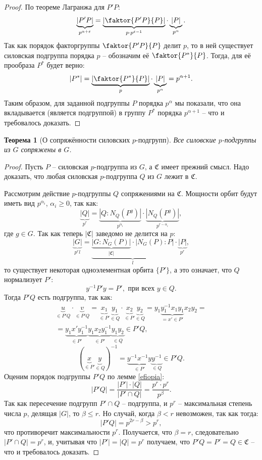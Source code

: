 \documentclass{article}
\newtheorem{theorem}{Теорема}[section]
\begin{document}
\begin{proof}
    По теореме Лагранжа для $P'P$: $$ \underbrace{|P'P|}_{p^{\alpha + \varepsilon}} = \underbrace{|\faktor{P'P}{P}|}_{p \cdot p^{\varepsilon - 1}} \cdot \underbrace{|P|}_{p^\alpha}. $$ Так как порядок факторгруппы $\faktor{P'P}{P}$ делит $p$, то в ней существует силовская подгруппа порядка $p$ -- обозначим её $\faktor{P^*}{P}$. Тогда, для её прообраза $P^*$ будет верно: $$ |P^*| = \underbrace{|\faktor{P^*}{P}|}_{p} \cdot \underbrace{|P|}_{p^\alpha} = p^{\alpha + 1}. $$ Таким образом, для заданной подгруппы $P$ порядка $p^\alpha$ мы показали, что она вкладывается (является подгруппой) в группу $P^*$ порядка $p^{\alpha + 1}$ -- что и требовалось доказать.
\end{proof}

\begin{theorem}[О сопряжённости силовских $p$-подгрупп]
    Все силовские $p$-подгруппы из $G$ сопряжены в $G$.
\end{theorem}
\begin{proof}
    Пусть $P$ -- силовская $p$-подгруппа из $G$, а $\mathfrak{C}$ имеет прежний смысл. Надо доказать, что любая силовская $p$-подгруппа $Q$ из $G$ лежит в $\mathfrak{C}$.

    Рассмотрим действие $p$-подгруппы $Q$ сопряжениями на $\mathfrak{C}$. Мощности орбит будут иметь вид $p^{\alpha_i}$, $\alpha_i \geqslant 0$, так как: $$ \underbrace{|Q|}_{p^r} = \underbrace{|Q:N_Q(P^g)|}_{p^{\alpha_i}} \cdot \underbrace{|N_Q(P^g)|}_{p^{r - \alpha_i}}, $$ где $g \in G$.
    Так как теперь $|\mathfrak{C}|$ заведомо не делится на $p$: $$ \underbrace{|G|}_{p^r l} = \underbrace{\underbrace{|G: N_G(P)|}_{|\mathfrak{C}|} \cdot |N_G(P):P|}_{l} \cdot \underbrace{|P|}_{p^r}, $$ то существует некоторая одноэлементная орбита $\{ P' \}$, а это означает, что $Q$ нормализует $P'$: $$ y^{-1} P' y = P', \text{ при всех } y \in Q. $$ Тогда $P'Q$ есть подгруппа, так как:
    \begin{multline*}
        \underbrace{u}_{\in P'Q} \cdot \underbrace{v}_{\in P'Q} = \underbrace{x_1}_{\in P'} \underbrace{y_1}_{\in Q} \cdot \underbrace{x_2}_{\in P'} \underbrace{y_2}_{\in Q} = y_1 \underbrace{y_1^{-1} x_1 y_1}_{ = x' \in P'} x_2 y_2 = \\
        = \underbrace{y_1 x' y_1^{-1}}_{ \in P'} \underbrace{y_1 x_2 y_1^{-1}}_{ \in P'} \underbrace{y_1 y_2}_{\in Q} \in P'Q,
    \end{multline*}
    \[
        (\underbrace{x}_{\in P'} \underbrace{y}_{\in Q})^{-1} = \underbrace{y^{-1} x^{-1} y}_{\in P'} \underbrace{y^{-1}}_{\in Q} \in P'Q.
    \]
    Оценим порядок подгруппы $P'Q$ по лемме \ref{efiopia}: $$ |P'Q| = \frac{|P'| \cdot |Q|}{|P' \cap Q|} = \frac{p^r \cdot p^r}{p^\beta}. $$ Так как пересечение подгрупп $P' \cap Q$ -- подгруппа, и $p^r$ -- максимальная степень числа $p$, делящая $|G|$, то $\beta \leqslant r$. Но случай, когда $\beta < r$ невозможен, так как тогда: $$ |P'Q| = p^{2r - \beta} > p^r, $$ что противоречит максимальности $p^r$. Получается, что $\beta = r$, следовательно $|P' \cap Q| = p^r$, и, учитывая что $|P'| = |Q| = p^r$ получаем, что $P'Q = P' = Q \in \mathfrak{C}$ -- что и требовалось доказать.
\end{proof}
\end{document}
